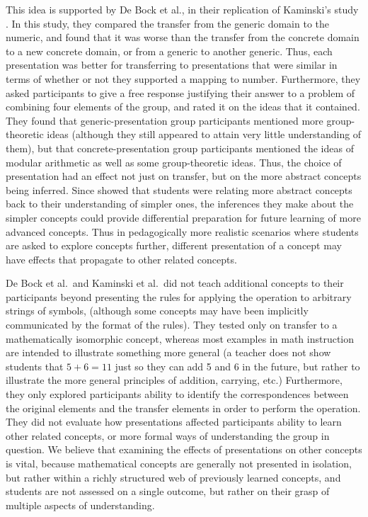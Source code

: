 \documentclass[man,10pt]{apa6}
\begin{document}
This idea is supported by De Bock et al., in their replication of Kaminski's study \cite{DeBock2011}. In this study, they compared the transfer from the generic domain to the numeric, and found that it was worse than the transfer from the concrete domain to a new concrete domain, or from a generic to another generic. Thus, each presentation was better for transferring to presentations that were similar in terms of whether or not they supported a mapping to number. Furthermore, they asked participants to give a free response justifying their answer to a problem of combining four elements of the group, and rated it on the ideas that it contained. They found that generic-presentation group participants mentioned more group-theoretic ideas (although they still appeared to attain very little understanding of them), but that concrete-presentation group participants mentioned the ideas of modular arithmetic as well as some group-theoretic ideas. Thus, the choice of presentation had an effect not just on transfer, but on the more abstract concepts being inferred. Since  showed that students were relating more abstract concepts back to their understanding of simpler ones, the inferences they make about the simpler concepts could provide differential preparation for future learning \cite{Bransford1999} of more advanced concepts. Thus in pedagogically more realistic scenarios where students are asked to explore concepts further, different presentation of a concept may have effects that propagate to other related concepts. \par
De Bock et al.\ and Kaminski et al.\ did not teach additional concepts to their participants beyond presenting the rules for applying the operation to arbitrary strings of symbols, (although some concepts may have been implicitly communicated by the format of the rules). They tested only on transfer to a mathematically isomorphic concept, whereas most examples in math instruction are intended to illustrate something more general (a teacher does not show students that $5+6 = 11$ just so they can add 5 and 6 in the future, but rather to illustrate the more general principles of addition, carrying, etc.) Furthermore, they only explored participants ability to identify the correspondences between the original elements and the transfer elements in order to perform the operation. They did not evaluate how presentations affected participants ability to learn other related concepts, or more formal ways of understanding the group in question. We believe that examining the effects of presentations on other concepts is vital, because mathematical concepts are generally not presented in isolation, but rather within a richly structured web of previously learned concepts, and students are not assessed on a single outcome, but rather on their grasp of multiple aspects of understanding.  
\end{document}
